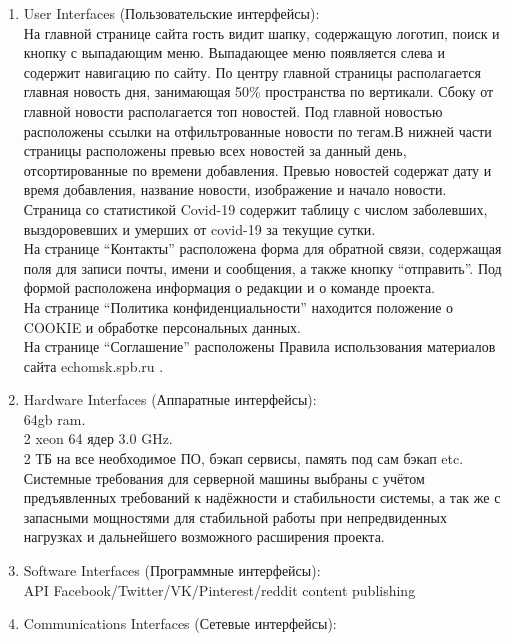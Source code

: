 \begin{enumerate}
\begin{enumerate}[label=3.\arabic*]
        \begin{enumerate}[label=3.6.\arabic*]
            \item User Interfaces (Пользовательские интерфейсы): \\
            На главной странице сайта гость видит шапку, содержащую логотип, поиск и кнопку с выпадающим меню.
            Выпадающее меню появляется слева и содержит навигацию по сайту. По центру главной страницы
            располагается главная новость дня, занимающая 50\% пространства по вертикали. Сбоку от главной
            новости располагается топ новостей. Под главной новостью расположены ссылки на отфильтрованные
            новости по тегам.В нижней части страницы расположены превью всех новостей за данный день, отсортированные
            по времени добавления. Превью новостей содержат дату и время добавления, название новости, изображение и начало новости. \\
            Страница со статистикой Covid-19 содержит таблицу с числом заболевших, выздоровевших и умерших от covid-19 за текущие сутки. \\
            На странице ``Контакты'' расположена форма для обратной связи, содержащая поля для записи почты, имени и сообщения, а также кнопку ``отправить''. Под формой расположена информация о редакции и о команде проекта. \\
            На странице ``Политика конфиденциальности'' находится положение о COOKIE и обработке персональных данных. \\
            На странице ``Соглашение'' расположены Правила использования материалов сайта echomsk.spb.ru .
            \item Hardware Interfaces (Аппаратные интерфейсы): \\
            64gb ram. \\
            2 xeon 64 ядер 3.0 GHz. \\
            2 ТБ на все необходимое ПО, бэкап сервисы, память под сам бэкап etc. \\
            Системные требования для серверной машины выбраны с учётом предъявленных требований к надёжности и стабильности системы,
            а так же с запасными мощностями для стабильной работы при непредвиденных нагрузках и дальнейшего возможного расширения проекта.
            \item Software Interfaces (Программные интерфейсы): \\
            API Facebook/Twitter/VK/Pinterest/reddit content publishing
            \item Communications Interfaces (Сетевые интерфейсы): \\

\end{enumerate}
\end{enumerate}
\end{enumerate}
